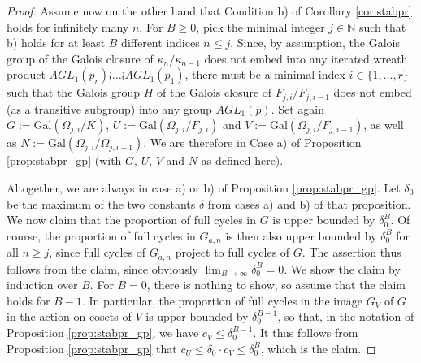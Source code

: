 \documentclass[a4paper]{amsart}
\begin{document}
\begin{proof}
Assume now on the other hand that Condition b) of Corollary \ref{cor:stabpr} holds for infinitely many $n$. For $B\ge 0$, pick the minimal integer $j\in \mathbb{N}$ such that b) holds for at least $B$ different indices $n\le j$. Since, by assumption, the Galois group of the Galois closure of $\kappa_n/\kappa_{n-1}$ does not embed into  any iterated wreath product $AGL_1(p_r)\wr\dots \wr AGL_1(p_1)$, there must be a minimal index $i\in \{1,\dots, r\}$ such that the Galois group $H$ of the Galois closure of $F_{j,i}/F_{j,i-1}$ does not embed (as a transitive subgroup) into any group $AGL_1(p)$.  Set again $G:=\textrm{Gal}(\Omega_{j,i}/K)$, $U:=\textrm{Gal}(\Omega_{j,i}/F_{j,i})$ and $V:=\textrm{Gal}(\Omega_{j,i}/F_{j,i-1})$, as well as $N:=\mathrm{Gal}(\Omega_{j,i}/\Omega_{j,i-1})$. We are therefore in Case a) of Proposition \ref{prop:stabpr_gp} (with $G$, $U$, $V$ and $N$ as defined here).


Altogether, we are always in case a) or b) of Proposition \ref{prop:stabpr_gp}.
Let $\delta_0$ be the maximum of the two constants $\delta$ from cases a) and b) of that proposition. 
We now claim that the proportion of full cycles in $G$ is upper bounded by $\delta_0^B$. Of course, the proportion of full cycles in $G_{a,n}$ is then also upper bounded by $\delta_0^B$ for all $n\ge j$, since full cycles of $G_{a,n}$ project to full cycles of $G$. The assertion thus follows from the claim, since obviously $\lim_{B\to \infty}\delta_0^B = 0$. We show the claim by induction over $B$. For $B=0$, there is nothing to show, so assume that the claim holds for $B-1$. In particular, the proportion of full cycles in the image $G_V$ of $G$ in the action on cosets of $V$ is upper bounded by $\delta_0^{B-1}$, so that, in the notation of Proposition \ref{prop:stabpr_gp}, we have $c_V\le \delta_0^{B-1}$. 
It thus follows from Proposition \ref{prop:stabpr_gp} that $c_U\le \delta_0\cdot c_V\le \delta_0^B$, which is the claim.
  \end{proof}
  
\end{document}

